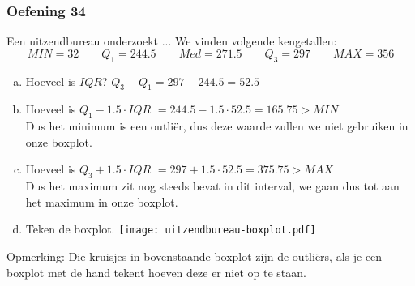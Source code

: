 \documentclass[13pt]{beamer}
\newenvironment{answer}
{\color{blue}}
{\color{black}}
\begin{document}
\begin{frame}
  \frametitle{Oefening 34}
Een uitzendbureau onderzoekt ... We vinden volgende kengetallen:
{\small $$MIN=32 \qquad  Q_1=244.5 \qquad Med=271.5 \qquad Q_3=297 \qquad MAX=356$$}
\vspace{-0.5cm}
\begin{enumerate}[(a)]
  \item Hoeveel is $IQR$?
    \begin{answer}
      $Q_3 - Q_1 = 297 - 244.5 = 52.5$
    \end{answer}
  \item Hoeveel is $Q_1-1.5\cdot IQR$
    \begin{answer}\small
      $= 244.5 - 1.5 \cdot 52.5 = 165.75 > MIN$\\
      Dus het minimum is een outliër, dus deze waarde zullen we niet gebruiken in onze boxplot.
    \end{answer}
  \item Hoeveel is $Q_3+1.5\cdot IQR$
    \begin{answer}\small
      $= 297 + 1.5 \cdot 52.5 = 375.75 > MAX$\\
      Dus het maximum zit nog steeds bevat in dit interval, we gaan dus tot aan het maximum in onze boxplot.
    \end{answer}
  \item Teken de boxplot.
    \texttt{[image: uitzendbureau-boxplot.pdf]}
  \end{enumerate}
  Opmerking: Die kruisjes in bovenstaande boxplot zijn de outliërs, als je een boxplot met de hand tekent hoeven deze er niet op te staan.
\end{frame}
\end{document}
